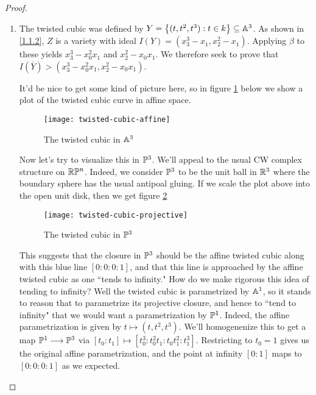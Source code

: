 \begin{proof}
\begin{enumerate}[label= (\alph*)]
        \item The twisted cubic was defined by $Y = \curly{(t, t^2, t^3) : t \in k} \subseteq \A^3$. As shown in \ref{1.1.2}, $Z$ is a variety with ideal $I(Y) = (x_3^3 - x_1, x_2^2 - x_1)$. Applying $\beta$ to these yields $x_3^3 - x_0^2 x_1$ and $x_2^2 - x_0 x_1$. We therefore seek to prove that $I(\overline Y) > (x_3^3 - x_0^2 x_1, x_2^2 - x_0 x_1)$.

        It'd be nice to get some kind of picture here, so in figure \ref{fig1.2.1} below we show a plot of the twisted cubic curve in affine space.

        \begin{figure}
            \centering
            \texttt{[image: twisted-cubic-affine]}
            \caption{The twisted cubic in $\A^3$}
            \label{fig1.2.1}
        \end{figure}

        Now let's try to visualize this in $\P^3$. We'll appeal to the usual CW complex structure on $\rp^n$. Indeed, we consider $\P^3$ to be the unit ball in $\R^3$ where the boundary sphere has the usual antipoal gluing. If we scale the plot above into the open unit disk, then we get figure \ref{fig1.2.2}

        \begin{figure}
            \centering
            \texttt{[image: twisted-cubic-projective]}
            \caption{The twisted cubic in $\P^3$}
            \label{fig1.2.2}
        \end{figure}

        This suggests that the closure in $\P^3$ should be the affine twisted cubic along with this blue line $[0 : 0 : 0 :1]$, and that this line is approached by the affine twisted cubic as one ``tends to infinity." How do we make rigorous this idea of tending to infinity? Well the twisted cubic is parametrized by $\A^1$, so it stands to reason that to parametrize its projective closure, and hence to ``tend to infinity" that we would want a parametrization by $\P^1$. Indeed, the affine parametrization is given by $t \mapsto (t, t^2, t^3)$. We'll homogenenize this to get a map $\P^1 \longrightarrow \P^3$ via $[t_0 : t_1] \mapsto [t_0^3 : t_0^2 t_1 : t_0 t_1^2 : t_1^3]$. Restricting to $t_0 = 1$ gives us the original affine parametrization, and the point at infinity $[0 : 1]$ maps to $[0 : 0 : 0 : 1]$ as we expected.


\end{enumerate}
\end{proof}
